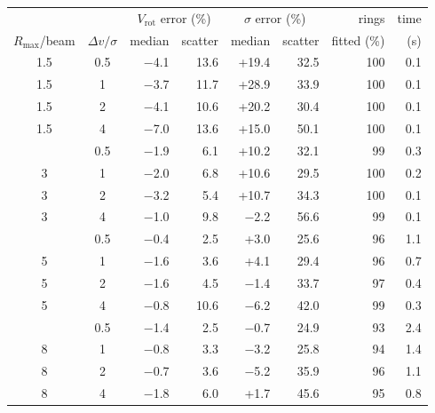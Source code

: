 \begin{tabular}{cc rr rr r r}
\toprule
 & & \multicolumn{2}{c}{$V_\mathrm{rot}$ error (\%)} & \multicolumn{2}{c}{$\sigma$ error (\%)} & rings & time \\
$R_\mathrm{max}$/beam & $\Delta v/\sigma$ & median & scatter & median & scatter & fitted (\%) & (s) \\
\midrule
1.5 & 0.5 & $-$4.1 & 13.6 & +19.4 & 32.5 & 100 & 0.1 \\
1.5 & 1 & $-$3.7 & 11.7 & +28.9 & 33.9 & 100 & 0.1 \\
1.5 & 2 & $-$4.1 & 10.6 & +20.2 & 30.4 & 100 & 0.1 \\
1.5 & 4 & $-$7.0 & 13.6 & +15.0 & 50.1 & 100 & 0.1 \\
\addlinespace
3 & 0.5 & $-$1.9 & 6.1 & +10.2 & 32.1 & 99 & 0.3 \\
3 & 1 & $-$2.0 & 6.8 & +10.6 & 29.5 & 100 & 0.2 \\
3 & 2 & $-$3.2 & 5.4 & +10.7 & 34.3 & 100 & 0.1 \\
3 & 4 & $-$1.0 & 9.8 & $-$2.2 & 56.6 & 99 & 0.1 \\
\addlinespace
5 & 0.5 & $-$0.4 & 2.5 & +3.0 & 25.6 & 96 & 1.1 \\
5 & 1 & $-$1.6 & 3.6 & +4.1 & 29.4 & 96 & 0.7 \\
5 & 2 & $-$1.6 & 4.5 & $-$1.4 & 33.7 & 97 & 0.4 \\
5 & 4 & $-$0.8 & 10.6 & $-$6.2 & 42.0 & 99 & 0.3 \\
\addlinespace
8 & 0.5 & $-$1.4 & 2.5 & $-$0.7 & 24.9 & 93 & 2.4 \\
8 & 1 & $-$0.8 & 3.3 & $-$3.2 & 25.8 & 94 & 1.4 \\
8 & 2 & $-$0.7 & 3.6 & $-$5.2 & 35.9 & 96 & 1.1 \\
8 & 4 & $-$1.8 & 6.0 & +1.7 & 45.6 & 95 & 0.8 \\
\bottomrule
\end{tabular}
